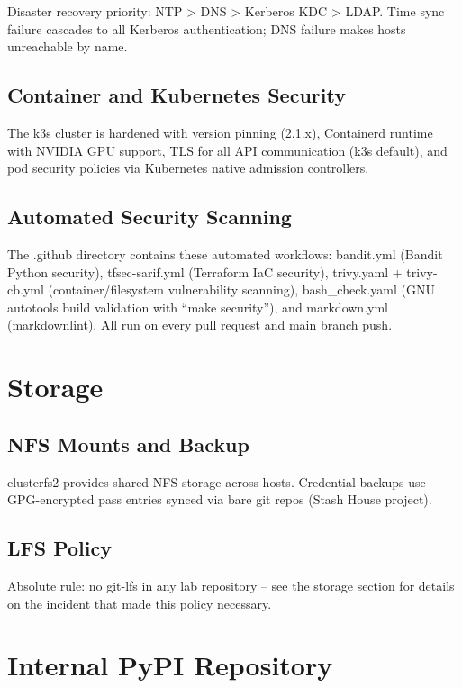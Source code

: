 Disaster recovery priority: NTP > DNS > Kerberos KDC > LDAP. Time sync failure cascades to all Kerberos authentication; DNS failure makes hosts unreachable by name.

\section{Container and Kubernetes Security}

The k3s cluster is hardened with version pinning (2.1.x), Containerd runtime with NVIDIA GPU support, TLS for all API communication (k3s default), and pod security policies via Kubernetes native admission controllers.

\section{Automated Security Scanning}

The .github directory contains these automated workflows: bandit.yml (Bandit Python security), tfsec-sarif.yml (Terraform IaC security), trivy.yaml + trivy-cb.yml (container/filesystem vulnerability scanning), bash\_check.yaml (GNU autotools build validation with ``make security''), and markdown.yml (markdownlint). All run on every pull request and main branch push.

\chapter{Storage}

\section{NFS Mounts and Backup}
clusterfs2 provides shared NFS storage across hosts. Credential backups use GPG-encrypted pass entries synced via bare git repos (Stash House project).

% 


\section{LFS Policy}
Absolute rule: no git-lfs in any lab repository -- see the storage section for details on the incident that made this policy necessary.

\chapter{Internal PyPI Repository}

